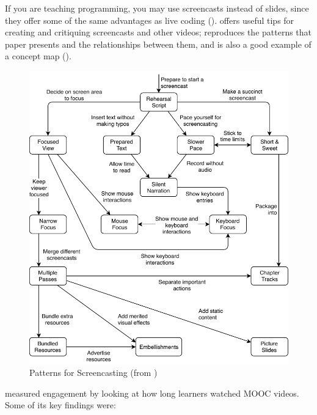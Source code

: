 If you are teaching programming, you may use screencasts instead of
slides, since they offer some of the same advantages as live coding
().  \cite{Chen2009} offers useful tips for
creating and critiquing screencasts and other videos;
 reproduces the patterns that paper
presents and the relationships between them, and is also a good
example of a concept map ().

\begin{figure}
\centering
\includegraphics{../docs/fig/screencast.pdf}
\caption{Patterns for Screencasting (from \cite{Chen2009})}
\label{f:online-screencasting}
\end{figure}

\cite{Guo2014} measured engagement by looking at how long learners
watched MOOC videos.  Some of its key findings were:

